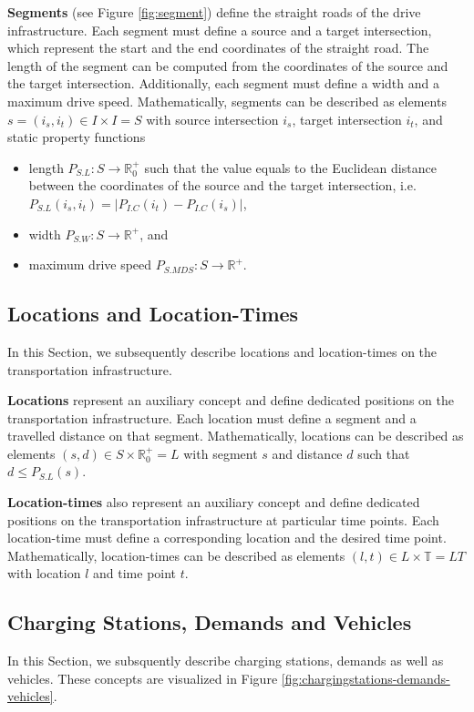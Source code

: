 \documentclass[graybox]{svmult}
\begin{document}
\noindent
\textbf{Segments} (see Figure \ref{fig:segment})
define the straight roads of the drive infrastructure.
Each segment must define a source and a target intersection, which represent the start and the end coordinates of the straight road.
The length of the segment can be computed from the coordinates of the source and the target intersection.
Additionally, each segment must define a width and a maximum drive speed.
Mathematically, segments can be described as elements $s = (i_s, i_t) \in I \times I = S$ with source intersection $i_s$, target intersection $i_t$, and static property functions
\begin{itemize}
	\item length $P_{S.L}: S \rightarrow \mathbb{R}_0^+$ such that the value equals to the Euclidean distance between the coordinates of the source and the target intersection, i.e.\ $P_{S.L}(i_s, i_t) = |P_{I.C}(i_t) - P_{I.C}(i_s)|$,
	\item width $P_{S.W}: S \rightarrow \mathbb{R}^+$, and
	\item maximum drive speed $P_{S.MDS}: S \rightarrow \mathbb{R}^+$.
\end{itemize}

\subsection{Locations and Location-Times}
\label{sec:locations-locationtimes}	
In this Section, we subsequently describe locations and location-times on the transportation infrastructure.

\vspace{4mm}
\noindent
\textbf{Locations}
represent an auxiliary concept and define dedicated positions on the transportation infrastructure.
Each location must define a segment and a travelled distance on that segment.
Mathematically, locations can be described as elements $(s, d) \in S \times \mathbb{R}_0^+ = L$ with segment $s$ and distance $d$ such that $d \leq P_{S.L}(s)$.

\vspace{4mm}
\noindent
\textbf{Location-times}
 also represent an auxiliary concept and define dedicated positions on the transportation infrastructure at particular time points.
Each location-time must define a corresponding location and the desired time point.
Mathematically, location-times can be described as elements $(l, t) \in L \times \mathbb{T} = LT$ with location $l$ and time point $t$.

\noindent
\subsection{Charging Stations, Demands and Vehicles}
\label{sec:chargingstations-demands-vehicles}	
In this Section, we subsquently describe charging stations, demands as well as vehicles. These concepts are visualized in Figure \ref{fig:chargingstations-demands-vehicles}.
\vspace{4mm}
\end{document}
